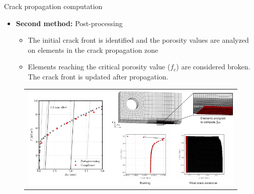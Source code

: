 \documentclass[9pt]{beamer}
\begin{document}
\begin{frame}{Crack propagation computation}

\begin{itemize}
	\item \textbf{Second method:} Post-processing
	\vspace{0.15cm}
	\begin{itemize}
	\item The initial crack front is identified and the porosity values are analyzed on elements in the crack propagation zone
	\vspace{0.15cm}
	\item Elements reaching the critical porosity value ($f_c$) are considered broken. The crack front is updated after propagation.
	\end{itemize}
\end{itemize}

\begin{figure}
        \begin{tabular}{c}
            \includegraphics[width=0.99\textwidth]{Images/post_processing_technique.pdf} \\
        \end{tabular}
    \end{figure}

\end{frame}

\end{document}
